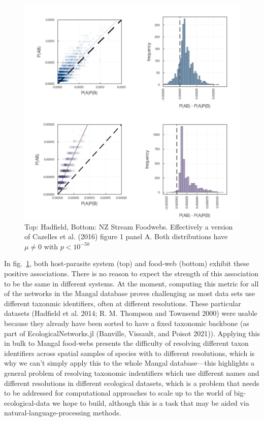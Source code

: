 \documentclass[11pt]{article}
\makeatletter
\def\maxwidth{\ifdim\Gin@nat@width>\linewidth\linewidth
\else\Gin@nat@width\fi}
\let\Oldincludegraphics\includegraphics
\renewcommand{\includegraphics}[1]{\Oldincludegraphics[width=\maxwidth]{#1}}
\makeatother
\begin{document}
\begin{figure}
\hypertarget{fig:associations}{%
\centering
\includegraphics{./figures/positiveassociations.png}
\caption{Top: Hadfield, Bottom: NZ Stream Foodwebs. Effectively a
version of Cazelles et al. (2016) figure 1 panel A. Both distributions
have \(\mu \neq 0\) with \(p < 10^{-50}\)}\label{fig:associations}
}
\end{figure}

In fig.~\ref{fig:associations}, both host-parasite system (top) and
food-web (bottom) exhibit these positive associations. There is no
reason to expect the strength of this association to be the same in
different systems. At the moment, computing this metric for all of the
networks in the Mangal database proves challenging as most data sets use
different taxonmic identifiers, often at different resolutions. These
particular datasets (Hadfield et al. 2014; R. M. Thompson and Townsend
2000) were usable because they already have been sorted to have a fixed
taxonomic backbone (as part of EcologicalNetworks.jl (Banville,
Vissault, and Poisot 2021)). Applying this in bulk to Mangal food-webs
presents the difficulty of resolving different taxon identifiers across
spatial samples of species with to different resolutions, which is why
we can't simply apply this to the whole Mangal database---this
highlights a general problem of resolving taxonomic indentifiers which
use different names and different resolutions in different ecological
datasets, which is a problem that needs to be addressed for
computational approaches to scale up to the world of big-ecological-data
we hope to build, although this is a task that may be aided via
natural-language-processing methods.
\end{document}
